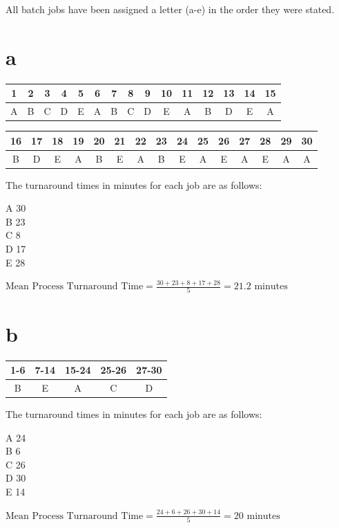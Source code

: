 All batch jobs have been assigned a letter (a-e) in the order they were stated.\par
	\part{a}
		\begin{tabular}{|c|c|c|c|c|c|c|c|c|c|c|c|c|c|c|}
			\hline
			1 & 2 & 3 & 4 & 5 & 6 & 7 & 8 & 9 & 10 & 11 & 12 & 13 & 14 & 15\\
			\hline
			A & B & C & D & E & A & B & C & D & E & A & B & D & E & A\\
			\hline
		\end{tabular}\par
		\begin{tabular}{|c|c|c|c|c|c|c|c|c|c|c|c|c|c|c|}
			\hline
			16 & 17 & 18 & 19 & 20 & 21 & 22 & 23 & 24 & 25 & 26 & 27 & 28 & 29 & 30\\
			\hline
			B & D & E & A & B & E & A & B & E &  A& E & A & E & A & A\\
			\hline
		\end{tabular}\par
		The turnaround times in minutes for each job are as follows: \par
		A 30\\
		B 23\\
		C 8\\
		D 17\\
		E 28\par
		$\text{Mean Process Turnaround Time} = \frac{30 + 23+ 8+ 17+ 28}{5}=21.2 \text{ minutes}$

	\part{b}
		\begin{tabular}{|c|c|c|c|c|}
			\hline
			1-6 & 7-14 & 15-24 & 25-26 & 27-30\\
			\hline
			B & E & A & C & D\\
			\hline
		\end{tabular}\par
		The turnaround times in minutes for each job are as follows:\par
		A 24\\
		B 6\\
		C 26\\
		D 30\\
		E 14\par
		$\text{Mean Process Turnaround Time} = \frac{24 + 6 + 26 + 30 + 14}{5} = 20 \text{ minutes}$

